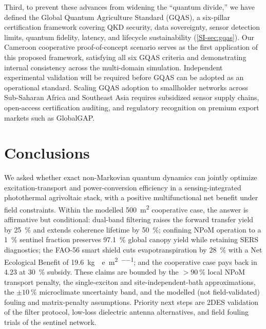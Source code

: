 \documentclass[preprint,12pt]{elsarticle}
\begin{document}
Third, to prevent these advances from widening the ``quantum divide,'' we have defined the Global Quantum Agriculture Standard (GQAS), a six-pillar certification framework covering QKD security, data sovereignty, sensor detection limits, quantum fidelity, latency, and lifecycle sustainability (\cref{SI-sec:gqas}). Our Cameroon cooperative proof-of-concept scenario serves as the first application of this proposed framework, satisfying all six GQAS criteria and demonstrating internal consistency across the multi-domain simulation. Independent experimental validation will be required before GQAS can be adopted as an operational standard. Scaling GQAS adoption to smallholder networks across Sub-Saharan Africa and Southeast Asia requires subsidized sensor supply chains, open-access certification auditing, and regulatory recognition on premium export markets such as GlobalGAP.


\section*{Conclusions}

We asked whether exact non-Markovian quantum dynamics can jointly optimize excitation-transport and power-conversion efficiency in a sensing-integrated photothermal agrivoltaic stack, with a positive multifunctional net benefit under field constraints. Within the modelled \qty{500}{\m\squared} cooperative case, the answer is affirmative but conditional: dual-band filtering raises the forward transfer yield by \qty{25}{\percent} and extends coherence lifetime by \qty{50}{\percent}; confining NPoM operation to a \qty{1}{\percent} sentinel fraction preserves \qty{97.1}{\percent} global canopy yield while retaining SERS diagnostics; the FAO-56 smart shield cuts evapotranspiration by \qty{28}{\percent} with a Net Ecological Benefit of \qty{19.6}{\kg{}e\per\m\squared\per\yr}; and the cooperative case pays back in \qty{4.23}{\yr} at \qty{30}{\percent} subsidy. These claims are bounded by the $>\qty{90}{\percent}$ local NPoM transport penalty, the single-exciton and site-independent-bath approximations, the $\pm\qty{10}{\percent}$ microclimate uncertainty band, and the modelled (not field-validated) fouling and matrix-penalty assumptions. Priority next steps are 2DES validation of the filter protocol, low-loss dielectric antenna alternatives, and field fouling trials of the sentinel network.
\end{document}
